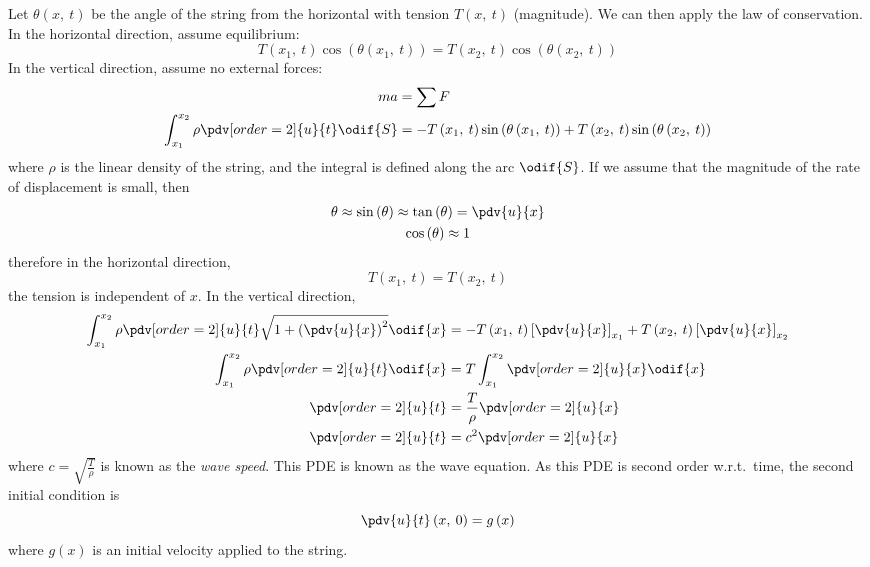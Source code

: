 \documentclass{article}
\begin{document}
Let \(\theta\left( x,\: t \right)\) be the angle of the string from the
horizontal with tension \(T\left( x,\: t \right)\) (magnitude). We can
then apply the law of conservation. In the horizontal direction, assume
equilibrium:
\begin{equation*}
    T\left( x_1,\: t \right) \cos{\left( \theta\left( x_1,\: t \right) \right)} = T\left( x_2,\: t \right) \cos{\left( \theta\left( x_2,\: t \right) \right)}
\end{equation*}
In the vertical direction, assume no external forces:
\begin{align*}
    m a                                                & = \sum F                                                                                                                                                     \\
    \int_{x_1}^{x_2} \rho \pdv[order=2]{u}{t} \odif{S} & = -T\left( x_1,\: t \right) \sin{\left( \theta\left( x_1,\: t \right) \right)} + T\left( x_2,\: t \right) \sin{\left( \theta\left( x_2,\: t \right) \right)}
\end{align*}
where \(\rho\) is the linear density of the string, and the integral is defined along the arc \(\odif{S}\).
If we assume that the magnitude of the rate of displacement is small, then
\begin{gather*}
    \theta \approx \sin{\left( \theta \right)} \approx \tan{\left( \theta \right)} = \pdv{u}{x} \\
    \cos{\left( \theta \right)} \approx 1
\end{gather*}
therefore in the horizontal direction,
\begin{equation*}
    T\left( x_1,\: t \right) = T\left( x_2,\: t \right)
\end{equation*}
the tension is independent of \(x\). In the vertical direction,
\begin{align*}
    \int_{x_1}^{x_2} \rho \pdv[order=2]{u}{t} \sqrt{1 + \left( \pdv{u}{x} \right)^2} \odif{x} & = -T\left( x_1,\: t \right) \left[ \pdv{u}{x} \right]_{x_1} + T\left( x_2,\: t \right) \left[ \pdv{u}{x} \right]_{x_2} \\
    \int_{x_1}^{x_2} \rho \pdv[order=2]{u}{t} \odif{x}                                        & = T \int_{x_1}^{x_2} \pdv[order=2]{u}{x} \odif{x}                                                                      \\
    \pdv[order=2]{u}{t}                                                                       & = \frac{T}{\rho} \pdv[order=2]{u}{x}                                                                                   \\
    \pdv[order=2]{u}{t}                                                                       & = c^2 \pdv[order=2]{u}{x}
\end{align*}
where \(c = \sqrt{\frac{T}{\rho}}\) is known as the \textit{wave speed}. This PDE is known as the wave equation.
As this PDE is second order w.r.t.\ time, the second initial condition is
\begin{equation*}
    \pdv{u}{t}\left( x,\: 0 \right) = g\left( x \right)
\end{equation*}
where \(g\left( x \right)\) is an initial velocity applied to the string.
\end{document}
